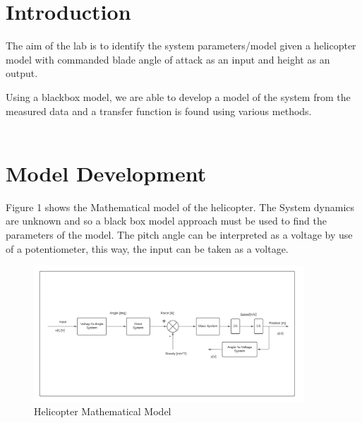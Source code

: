 \documentclass[12pt]{article}
\begin{document}

\tableofcontents
\pagebreak


\section{\Large{Introduction}}

The aim of the lab is to identify the system parameters/model given a helicopter model with commanded blade angle of attack as an input and height as an output.

Using a blackbox model, we are able to develop a model of the system from the measured data and a transfer function is found using various methods. 
\\\\

\section{\Large{Model Development}}

Figure 1 shows the Mathematical model of the helicopter. The System dynamics are unknown and so a black box model approach must be used to find the parameters of the model.\cite{2} The pitch angle can be interpreted as a voltage by use of a potentiometer, this way, the input can be taken as a voltage. 

 \begin{figure}[H]
     \centering
     \includegraphics[width=0.9\textwidth]{model.png}
     \caption{Helicopter Mathematical Model}
     \label{fig:sample}
 \end{figure}
\end{document}
